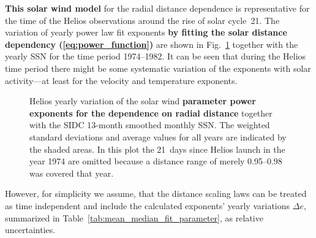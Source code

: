 \textbf{This solar wind model} for the radial distance dependence is representative for the time of the Helios observations around the rise of solar cycle~21. The variation of yearly power law fit exponents \textbf{by fitting the solar distance dependency (\ref{eq:power_function})} are shown in Fig.~\ref{fig:yearly_gradients_c} together with the yearly SSN for the time period \numrange{1974}{1982}. It can be seen that during the Helios time period there might be some systematic  variation of the exponents with solar activity---at least for the velocity and temperature exponents.
\begin{figure}
	\caption{Helios yearly variation of the solar wind \textbf{parameter power exponents for the dependence on radial distance} together with the SIDC 13-month smoothed monthly SSN. The weighted standard deviations and average values for all years are indicated by the shaded areas. In this plot the 21~days since Helios launch in the year 1974 are omitted because a distance range of merely \SIrange{0.95}{0.98}{\au} was covered that year.}
	\label{fig:yearly_gradients_c}
\end{figure}
However, for simplicity we assume, that the distance scaling laws can be treated as time independent and include the calculated exponents’ yearly variations $\Delta e$, summarized in Table~\ref{tab:mean_median_fit_parameter}, as relative uncertainties.

